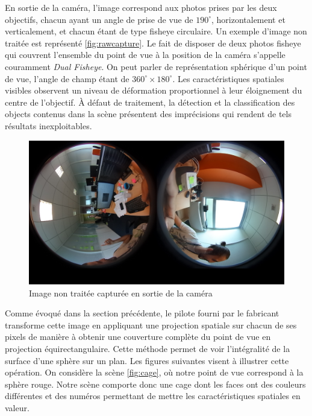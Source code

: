 			En sortie de la caméra, l'image correspond aux photos prises par les deux objectifs, chacun ayant un angle de prise de vue de $190^{\circ}$, horizontalement et verticalement, et chacun étant de type \gls{fisheye} circulaire. Un exemple d'image non traitée est représenté \autoref{fig:rawcapture}. Le fait de disposer de deux photos \gls{fisheye} qui couvrent l'ensemble du point de vue à la position de la caméra s'appelle couramment \emph{Dual Fisheye}. On peut parler de représentation sphérique d'un point de vue, l'angle de champ étant de $360^{\circ}\times180^{\circ}$. Les caractéristiques spatiales visibles observent un niveau de déformation proportionnel à leur éloignement du centre de l'objectif. À défaut de traitement, la détection et la classification des objects contenus dans la scène présentent des imprécisions qui rendent de tels résultats inexploitables.
			\begin{figure}[h]
			{
				\centering
				\includegraphics[width=1\textwidth]{figures/capture.jpg}
				\caption{Image non traitée capturée en sortie de la caméra}
				\label{fig:rawcapture}
			}
			\end{figure}
			\par
			Comme évoqué dans la section précédente, le pilote fourni par le fabricant transforme cette image en appliquant une projection spatiale sur chacun de ses pixels de manière à obtenir une couverture complète du point de vue en projection équirectangulaire. Cette méthode permet de voir l'intégralité de la surface d'une sphère sur un plan. Les figures suivantes visent à illustrer cette opération.
			On considère la scène \autoref{fig:cage}, où notre point de vue correspond à la sphère rouge. Notre scène comporte donc une cage dont les faces ont des couleurs différentes et des numéros permettant de mettre les caractéristiques spatiales en valeur.
